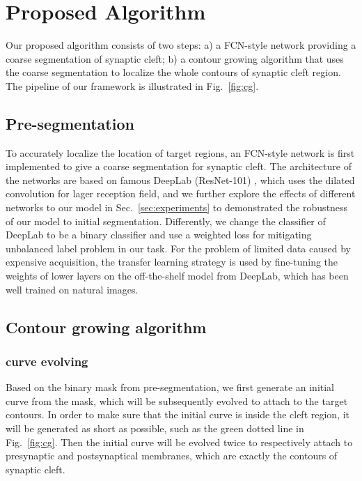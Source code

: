 \section{Proposed Algorithm}
\label{sec:algorithm}


Our proposed algorithm consists of two steps:
a) a FCN-style network providing a coarse segmentation of synaptic cleft;
b) a contour growing algorithm that uses the coarse segmentation to localize the whole contours of synaptic cleft region.
The pipeline of our framework is illustrated in Fig.~\ref{fig:cg}.

\subsection{Pre-segmentation}

To accurately localize the location of target regions, an FCN-style network is first implemented to give a coarse segmentation for synaptic cleft.
The architecture of the networks are based on famous DeepLab (ResNet-101) \cite{Chen2016a}, which uses the dilated convolution for lager reception field, and we further explore the effects of different networks to our model in Sec.~\ref{sec:experiments} to demonstrated the robustness of our model to initial segmentation.
%
Differently, we change the classifier of DeepLab to be a binary classifier and use a weighted loss for mitigating unbalanced label problem in our task.
For the problem of limited data caused by expensive acquisition, the transfer learning strategy is used by fine-tuning the weights of lower layers on the off-the-shelf model from DeepLab, which has been well trained on natural images.

\subsection{Contour growing algorithm}
\subsubsection{curve evolving}
\label{sec:curve_evolving}
Based on the binary mask from pre-segmentation, we first generate an initial curve from the mask, which will be subsequently evolved to attach to the target contours.
%
In order to make sure that the initial curve is inside the cleft region, it will be generated as short as possible, such as the green dotted line in Fig.~\ref{fig:cg}.
Then the initial curve will be evolved twice to respectively attach to presynaptic and postsynaptical membranes, which are exactly the contours of synaptic cleft.

